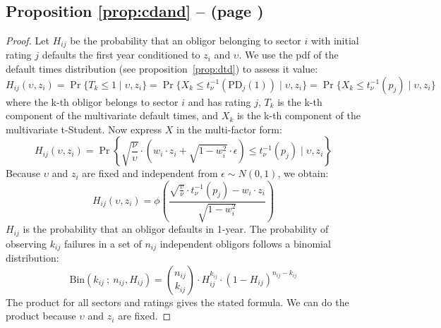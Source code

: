 \documentclass[11pt,fleqn]{book} %
\begin{document}
\section{}

\subsection{Proposition \ref{prop:cdand} --  (page \pageref{prop:cdand})}
\begin{proof}
	Let $H_{ij}$ be the probability that an obligor belonging to sector $i$
	with initial rating $j$ defaults the first year conditioned to $z_i$ 
	and $\upsilon$. We use the pdf of the default times distribution (see 
	proposition~\ref{prop:dtd}) to assess it value:
	\begin{displaymath}
		H_{ij}(\upsilon,z_i) = 
		\Pr\{T_k \le 1 \mid \upsilon, z_i\} = 
		\Pr\{ X_k \le t_{\nu}^{-1}(\text{PD}_j(1)) \mid \upsilon, z_i\} = 
		\Pr\{ X_k \le t_{\nu}^{-1}(p_j) \mid \upsilon, z_i\}
	\end{displaymath}
	where the k-th obligor belongs to sector $i$ and has rating $j$, 
	$T_k$ is the k-th component of the multivariate default 
	times, and $X_k$ is the k-th component of the multivariate t-Student. 
	Now express $X$ in the multi-factor form:
	\begin{displaymath}
		H_{ij}(\upsilon,z_i) = \Pr \left\{ 
		\sqrt{\frac{\nu}{\upsilon}} \cdot \left( w_i \cdot z_i + \sqrt{1-w_i^2} \cdot \epsilon\right)
		\le t_{\nu}^{-1}(p_j) \mid \upsilon, z_i
		\right\}
	\end{displaymath}
	Because $\upsilon$ and $z_i$ are fixed and independent from $\epsilon \sim N(0,1)$, we obtain:
	\begin{displaymath}
		H_{ij}(\upsilon,z_i) = \phi\left(  
		\frac{\sqrt{\frac{\upsilon}{\nu}} \cdot t_{\nu}^{-1}(p_j) - w_i\cdot z_i}{\sqrt{1-w_i^2}}
		\right)
	\end{displaymath}
	$H_{ij}$ is the probability that an obligor defaults in 1-year. The 
	probability of observing $k_{ij}$ failures in a set of $n_{ij}$ independent
	obligors follows a binomial distribution:
	\begin{displaymath}
		\text{Bin}(k_{ij}\ ;\ n_{ij},H_{ij}) = 
		\binom{n_{ij}}{k_{ij}} \cdot H_{ij}^{k_{ij}} \cdot (1-H_{ij})^{n_{ij}-k_{ij}}
	\end{displaymath}
	The product for all sectors and ratings gives the stated formula. 
	We can do the product because $\upsilon$ and $z_i$ are fixed.
\end{proof}
\end{document}

